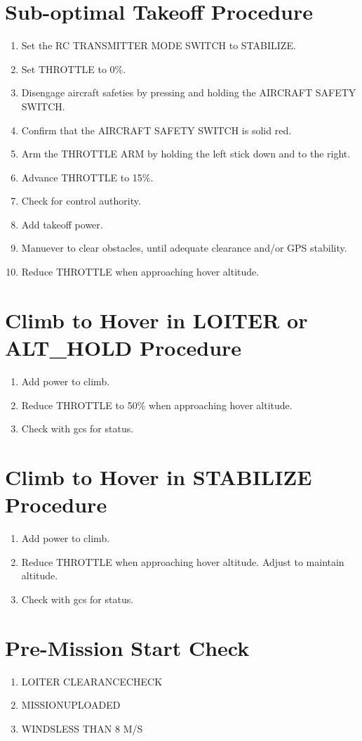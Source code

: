 \documentclass{report}
\begin{document}
	\section{Sub-optimal Takeoff Procedure}
		\begin{enumerate}
			\item Set the RC TRANSMITTER MODE SWITCH to STABILIZE.
			\item Set THROTTLE to 0\%.
			\item Disengage aircraft safeties by pressing and holding the AIRCRAFT SAFETY SWITCH.
			\item Confirm that the AIRCRAFT SAFETY SWITCH is solid red.
			\item Arm the THROTTLE ARM by holding the left stick down and to the right.
			\item Advance THROTTLE to 15\%.
			\item Check for control authority.
			\item Add takeoff power.
			\item Manuever to clear obstacles, until adequate clearance and/or GPS stability.
			\item Reduce THROTTLE when approaching hover altitude.
		\end{enumerate}
	\section{Climb to Hover in LOITER or ALT\_HOLD Procedure}
		\begin{enumerate}
			\item Add power to climb.
			\item Reduce THROTTLE to 50\% when approaching hover altitude.
			\item Check with \gls{gcs} for status.
		\end{enumerate}
	\section{Climb to Hover in STABILIZE Procedure}
		\begin{enumerate}
			\item Add power to climb.
			\item Reduce THROTTLE when approaching hover altitude.  Adjust to maintain altitude.
			\item Check with \gls{gcs} for status.
		\end{enumerate}
	\section{Pre-Mission Start Check}
		\begin{enumerate}
			\item LOITER CLEARANCE\hrulefill CHECK
			\item MISSION\hrulefill UPLOADED
			\item WINDS\hrulefill LESS THAN 8 M/S
		\end{enumerate}
\end{document}
